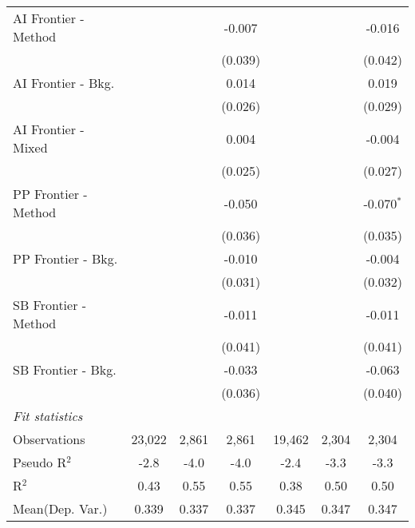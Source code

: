\begin{tabular}{lcccccc}
   AI Frontier - Method &               &         & -0.007  &               &         & -0.016\\   
                        &               &         & (0.039) &               &         & (0.042)\\   
   AI Frontier - Bkg.   &               &         & 0.014   &               &         & 0.019\\   
                        &               &         & (0.026) &               &         & (0.029)\\   
   AI Frontier - Mixed  &               &         & 0.004   &               &         & -0.004\\   
                        &               &         & (0.025) &               &         & (0.027)\\   
   PP Frontier - Method &               &         & -0.050  &               &         & -0.070$^{*}$\\   
                        &               &         & (0.036) &               &         & (0.035)\\   
   PP Frontier - Bkg.   &               &         & -0.010  &               &         & -0.004\\   
                        &               &         & (0.031) &               &         & (0.032)\\   
   SB Frontier - Method &               &         & -0.011  &               &         & -0.011\\   
                        &               &         & (0.041) &               &         & (0.041)\\   
   SB Frontier - Bkg.   &               &         & -0.033  &               &         & -0.063\\   
                        &               &         & (0.036) &               &         & (0.040)\\   
   \midrule
   \emph{Fit statistics}\\
   Observations         & 23,022        & 2,861   & 2,861   & 19,462        & 2,304   & 2,304\\  
   Pseudo R$^2$         & -2.8          & -4.0    & -4.0    & -2.4          & -3.3    & -3.3\\  
   R$^2$                & 0.43          & 0.55    & 0.55    & 0.38          & 0.50    & 0.50\\  
Mean(Dep. Var.) & 0.339 & 0.337 & 0.337 & 0.345 & 0.347 & 0.347 \\
   

\end{tabular}
